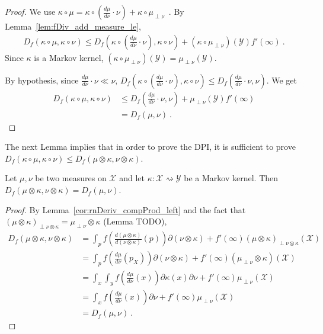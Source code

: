 \begin{proof}\leanok
{}
We use $\kappa \circ \mu = \kappa \circ (\frac{d\mu}{d\nu}\cdot \nu) + \kappa \circ \mu_{\perp \nu}$~.
By Lemma~\ref{lem:fDiv_add_measure_le},
\begin{align*}
D_f(\kappa \circ \mu, \kappa \circ \nu)
\le D_f\left(\kappa \circ (\frac{d\mu}{d\nu}\cdot \nu), \kappa \circ \nu\right)
  + (\kappa \circ \mu_{\perp \nu})(\mathcal Y) f'(\infty)
\: .
\end{align*}
Since $\kappa$ is a Markov kernel, $(\kappa \circ \mu_{\perp \nu})(\mathcal Y) = \mu_{\perp \nu}(\mathcal Y)$.

By hypothesis, since $\frac{d\mu}{d\nu}\cdot \nu \ll \nu$, $D_f\left(\kappa \circ (\frac{d\mu}{d\nu}\cdot \nu), \kappa \circ \nu\right) \le D_f\left(\frac{d\mu}{d\nu}\cdot \nu, \nu\right)$.
We get
\begin{align*}
D_f(\kappa \circ \mu, \kappa \circ \nu)
&\le D_f\left(\frac{d\mu}{d\nu}\cdot \nu,\nu\right)
  + \mu_{\perp \nu}(\mathcal Y) f'(\infty)
\\
&= D_f(\mu, \nu)
\: .
\end{align*}
\end{proof}


The next Lemma implies that in order to prove the DPI, it is sufficient to prove $D_f(\kappa \circ \mu, \kappa \circ \nu) \le D_f(\mu \otimes \kappa, \nu \otimes \kappa)$.


\begin{lemma}
  \label{thm:fDiv_compProd_left_1}
  \leanok
  Let $\mu, \nu$ be two measures on $\mathcal X$ and let $\kappa : \mathcal X \rightsquigarrow \mathcal Y$ be a Markov kernel.
  Then $D_f(\mu \otimes \kappa, \nu \otimes \kappa) = D_f(\mu, \nu)$.
\end{lemma}

\begin{proof}\leanok
{}
By Lemma~\ref{cor:rnDeriv_compProd_left} and the fact that $(\mu \otimes \kappa)_{\perp \nu \otimes \kappa} = \mu_{\perp \nu} \otimes \kappa$ (Lemma TODO),
\begin{align*}
D_f(\mu \otimes \kappa, \nu \otimes \kappa)
&= \int_{p} f \left(\frac{d (\mu \otimes \kappa)}{d (\nu \otimes \kappa)}(p)\right) \partial(\nu \otimes \kappa)
  + f'(\infty) (\mu \otimes \kappa)_{\perp \nu \otimes \kappa}(\mathcal X)
\\
&= \int_{p} f \left(\frac{d \mu}{d \nu}(p_X)\right) \partial(\nu \otimes \kappa)
  + f'(\infty) (\mu_{\perp \nu} \otimes \kappa)(\mathcal X)
\\
&= \int_x \int_y f \left(\frac{d \mu}{d \nu}(x)\right) \partial \kappa(x) \partial \nu
  + f'(\infty) \mu_{\perp \nu}(\mathcal X)
\\
&= \int_x f \left(\frac{d \mu}{d \nu}(x)\right) \partial \nu
  + f'(\infty) \mu_{\perp \nu}(\mathcal X)
\\
&= D_f(\mu, \nu)
\: .
\end{align*}
\end{proof}


